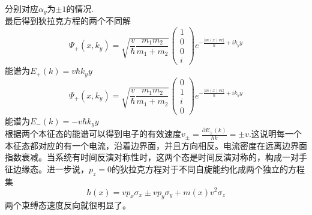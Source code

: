 \documentclass{article}
\numberwithin{equation}{subsection}
\begin{document}
分别对应$\alpha_y$为$\pm1$的情况.\\
最后得到狄拉克方程的两个不同解
\begin{equation}
    \Psi_+(x,k_y)=\sqrt{\frac{v}{\hbar}\frac{m_1m_2}{m_1+m_2}}\begin{pmatrix}
        1\\0\\0\\i
    \end{pmatrix}e^{-\frac{|m(x)vx|}{\hbar}+ik_yy}
\end{equation}
能谱为$E_+(k)=v\hbar k_yy$
\begin{equation}
    \Psi_+(x,k_y)=\sqrt{\frac{v}{\hbar}\frac{m_1m_2}{m_1+m_2}}\begin{pmatrix}
        0\\1\\i\\0
    \end{pmatrix}e^{-\frac{|m(x)vx|}{\hbar}+ik_yy}
\end{equation}
能谱为$E_-(k)=-v\hbar k_yy$\\
根据两个本征态的能谱可以得到电子的有效速度$v_{\pm}=\frac{\partial E_{\pm}(k)}{\hbar k}=\pm v$.这说明每一个本征态都对应的有一个电流，沿着边界面，并且方向相反。电流密度在远离边界面指数衰减。当系统有时间反演对称性时，这两个态是时间反演对称的，构成一对手征边缘态。进一步说，$p_z=0$的狄拉克方程对于不同自旋能约化成两个独立的方程集
\begin{equation}
    h(x)=vp_x\sigma_x\pm vp_y\sigma_y+m(x)v^2\sigma_z
\end{equation}
两个束缚态速度反向就很明显了。
\end{document}
